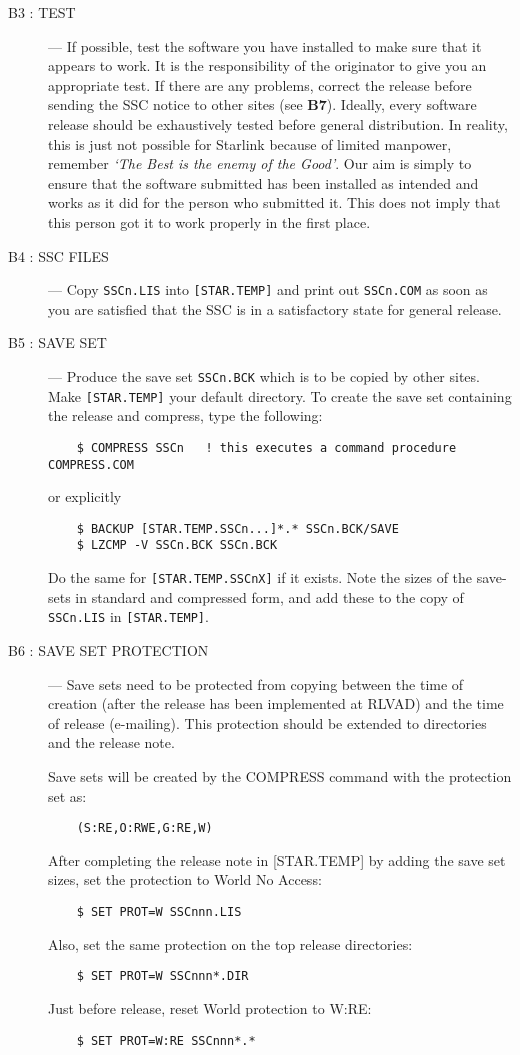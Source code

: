 \begin{description}
\item [B3 : TEST] ---
If possible, test the software you have installed to make sure that it appears
to work.
It is the responsibility of the originator to give you an appropriate test.
If there are any problems, correct the release before sending the SSC notice to
other sites (see {\bf B7}).
Ideally, every software release should be exhaustively tested before general
distribution.
In reality, this is just not possible for Starlink because of limited manpower,
remember {\em `The Best is the enemy of the Good'}.
Our aim is simply to ensure that the software submitted has been installed
as intended and works as it did for the person who submitted it.
This does not imply that this person got it to work properly in the first place.

\item [B4 : SSC FILES] ---
Copy {\tt SSCn.LIS} into {\tt [STAR.TEMP]} and print out {\tt SSCn.COM} as
soon as you are satisfied that the SSC is in a satisfactory state for general
release.

\item [B5 : SAVE SET] ---
Produce the save set {\tt SSCn.BCK} which is to be copied by other sites.
Make {\tt [STAR.TEMP]} your default directory.
To create the save set containing the release and compress, type the following:
\begin{verbatim}
    $ COMPRESS SSCn   ! this executes a command procedure COMPRESS.COM
\end{verbatim}
or explicitly
\begin{verbatim}
    $ BACKUP [STAR.TEMP.SSCn...]*.* SSCn.BCK/SAVE
    $ LZCMP -V SSCn.BCK SSCn.BCK
\end{verbatim}
Do the same for {\tt [STAR.TEMP.SSCnX]} if it exists.
Note the sizes of the save-sets in standard and compressed form, and add these
to the copy of {\tt SSCn.LIS} in {\tt [STAR.TEMP]}.

\item [B6 : SAVE SET PROTECTION] ---
Save sets need to be protected from copying between the time of creation
(after the release has been implemented at RLVAD) and the time of release
(e-mailing).
This protection should be extended to directories and the release note.

Save sets will be created by the COMPRESS command with the protection set as:
\begin{verbatim}
    (S:RE,O:RWE,G:RE,W)
\end{verbatim}
After completing the release note in [STAR.TEMP] by adding the save set sizes,
set the protection to World No Access:
\begin{verbatim}
    $ SET PROT=W SSCnnn.LIS
\end{verbatim}
Also, set the same protection on the top release directories:
\begin{verbatim}
    $ SET PROT=W SSCnnn*.DIR
\end{verbatim}
Just before release, reset World protection to W:RE:
\begin{verbatim}
    $ SET PROT=W:RE SSCnnn*.*
\end{verbatim}


\end{description}
